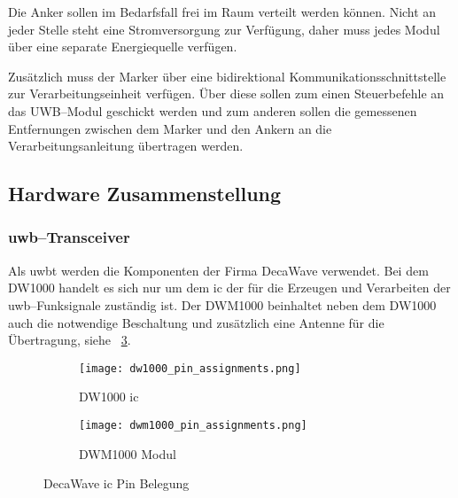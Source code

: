 Die Anker sollen im Bedarfsfall frei im Raum verteilt werden können. Nicht an jeder Stelle steht eine Stromversorgung zur Verfügung, daher muss jedes Modul über eine separate Energiequelle verfügen.

Zusätzlich muss der Marker über eine bidirektional Kommunikationsschnittstelle zur Verarbeitungseinheit verfügen. Über diese sollen zum einen Steuerbefehle an das UWB--Modul geschickt werden und zum anderen sollen die gemessenen Entfernungen zwischen dem Marker und den Ankern an die Verarbeitungsanleitung übertragen werden.


\begin{comment}
------------------------------------------------------------------------------------------
- Zusätzlich werden Erfahrungsberichte aus dem Internet ausgewertet um die Beschaltung weiter zu verfeinern, siehe \cite{Trojer2015, Holder2016, Holder2016a}.
\end{comment}
\subsection{Hardware Zusammenstellung}


\begin{comment}
------------------------------------------------------------------------------------------
TODO: Wie wird der Vorwiderstand berechnet? ca. 10mA bei 1.8V, R=(U_0-U_LED)/I_LED

LED Vorwiderstand berechnen
	- https://www.youtube.com/watch?v=iNZj91TSRUg
	- DW1000 Datasheet - 5.9 General Purpose Input Output (GPIO)
\end{comment}
\subsubsection{\gls{uwb}--Transceiver}\label{subsec:uwb_transceiver}

Als \gls{uwbt} werden die Komponenten der Firma DecaWave verwendet. Bei dem DW1000 handelt es sich nur um dem \gls{ic} der für die Erzeugen und Verarbeiten der \gls{uwb}--Funksignale zuständig ist. Der DWM1000 beinhaltet neben dem DW1000 auch die notwendige Beschaltung und zusätzlich eine Antenne für die Übertragung, siehe \figurename~\ref{fig:pin_assignment}.

\begin{figure}
	\begin{subfigure}[t]{0.4\textwidth}
		\texttt{[image: dw1000\_pin\_assignments.png]}
		\caption{DW1000 \gls{ic}}
		\label{fig:dw1000_pin_assignments}
	\end{subfigure}
	\hfill
	\begin{subfigure}[t]{0.4\textwidth}
		\texttt{[image: dwm1000\_pin\_assignments.png]}
		\caption{DWM1000 Modul}
		\label{fig:dwm1000_pin_assignments}
	\end{subfigure}
	\caption{DecaWave \gls{ic} Pin Belegung}
	\label{fig:pin_assignment}
\end{figure}

